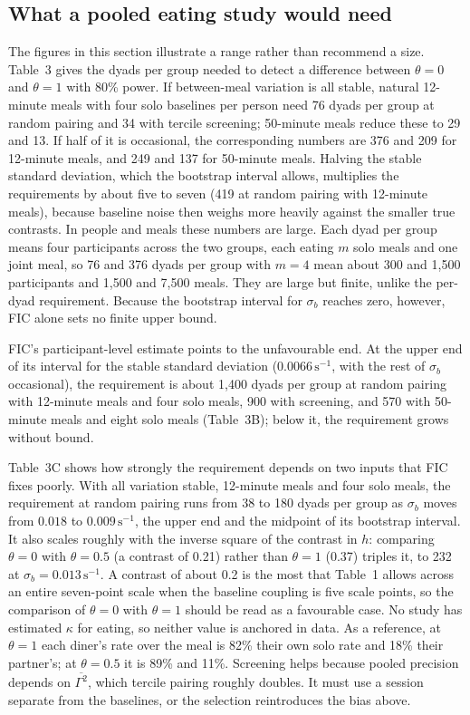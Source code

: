 \documentclass[12pt]{article}
\begin{document}
\subsection*{What a pooled eating study would need}

The figures in this section illustrate a range rather than recommend a size.
Table~3 gives the dyads per
group needed to detect a difference between $\theta=0$ and $\theta=1$ with 80\%
power. If between-meal variation is all
stable, natural 12-minute meals with four solo baselines per person need 76 dyads
per group at random pairing and 34 with tercile screening; 50-minute meals reduce
these to 29 and 13. If half of it is occasional, the corresponding numbers are 376
and 209 for 12-minute meals, and 249 and 137 for 50-minute meals. Halving the
stable standard deviation, which the bootstrap interval allows, multiplies the
requirements by about five to seven (419 at random pairing with 12-minute meals),
because baseline noise then weighs more heavily against the smaller true
contrasts. In people and meals these numbers are large. Each dyad per group means
four participants across the two groups, each eating $m$ solo meals and one joint
meal, so 76 and 376 dyads per group with $m=4$ mean about 300 and 1{,}500
participants and 1{,}500 and 7{,}500 meals. They are large but finite, unlike the
per-dyad requirement. Because the bootstrap interval for $\sigma_b$ reaches zero,
however, FIC alone sets no finite upper bound.

FIC's participant-level estimate points to the unfavourable end. At the upper end
of its interval for the stable standard deviation ($0.0066\,\mathrm{s}^{-1}$, with
the rest of $\sigma_b$ occasional), the requirement is about 1{,}400 dyads per group
at random pairing with 12-minute meals and four solo meals, 900 with screening, and
570 with 50-minute meals and eight solo meals (Table~3B); below it, the requirement
grows without bound.

Table~3C shows how strongly the requirement depends on two inputs that FIC fixes
poorly. With all variation stable, 12-minute meals and four solo meals, the
requirement at random pairing runs from 38 to 180 dyads per group as $\sigma_b$
moves from $0.018$ to $0.009\,\mathrm{s}^{-1}$, the upper end and the midpoint of
its bootstrap interval. It also scales roughly with the inverse square of the
contrast in $h$: comparing $\theta=0$ with $\theta=0.5$ (a contrast of 0.21)
rather than $\theta=1$ (0.37) triples it, to 232 at $\sigma_b=0.013\,\mathrm{s}^{-1}$.
A contrast of about 0.2 is the most that Table~1 allows across an entire
seven-point scale when the baseline coupling is five scale points, so the
comparison of $\theta=0$ with $\theta=1$ should be read as a favourable case.
No study has estimated $\kappa$ for eating, so neither value is anchored in data.
As a reference, at $\theta=1$ each diner's rate over the meal is 82\% their own
solo rate and 18\% their partner's; at $\theta=0.5$ it is 89\% and 11\%.
Screening helps because
pooled precision depends on $\overline{\Gamma^2}$, which tercile pairing roughly
doubles. It must use a session separate from the baselines, or the selection
reintroduces the bias above.
\end{document}
